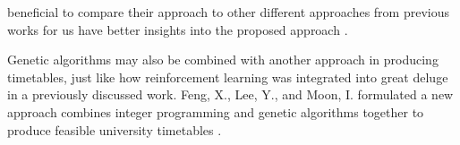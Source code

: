 beneficial to compare their approach to other different approaches from previous works for us have better insights into the proposed approach \cite{raghavjee-ga-south-africa}.

Genetic algorithms may also be combined with another approach in producing timetables, just like how reinforcement learning was integrated into great deluge in a previously discussed work. Feng, X., Lee, Y., and Moon, I. formulated a new approach combines integer programming and genetic algorithms together to produce feasible university timetables \cite{feng-integer-prog-ga}.

%
%
%
%
%
%
%
%
%